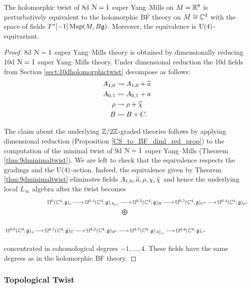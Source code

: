 \documentclass[10pt, oneside]{article}
\begin{document}
\begin{theorem}
The holomorphic twist of 8d $\mathcal N=1$ super Yang--Mills on $M=\mathbb R^8$ is perturbatively equivalent to the holomorphic BF theory on $M\cong\mathbb C^4$ with the space of fields $T^*[-1]\operatorname{Map}(M, B\mathfrak g)$. Moreover, the equivalence is $\mathrm{U}(4)$-equivariant.
\label{thm:8dholomorphictwist}
\end{theorem}
\begin{proof}
8d $\mathcal N=1$ super Yang--Mills theory is obtained by dimensionally reducing 10d $\mathcal N=1$ super Yang--Mills theory. Under dimensional reduction the 10d fields from Section \ref{sect:10dholomorphictwist} decompose as follows:
\begin{align*}
A_{1, 0}&\rightsquigarrow A_{1, 0}+ \widetilde{a} \\
A_{0, 1}&\rightsquigarrow A_{0, 1}+ a \\
\rho&\rightsquigarrow \rho+ \widetilde{\chi} \\
B&\rightsquigarrow B+ C.
\end{align*}

The claim about the underlying $\mathbb Z/2\mathbb Z$-graded theories follows by applying dimensional reduction (Proposition \ref{CS_to_BF_diml_red_prop}) to the computation of the minimal twist of 9d $\mathcal N=1$ super Yang--Mills (Theorem \ref{thm:9dminimaltwist}). We are left to check that the equivalence respects  the gradings and the $\mathrm{U}(4)$-action. Indeed, the equivalence given by Theorem \ref{thm:9dminimaltwist} eliminates fields $A_{1, 0}, \widetilde{a}, \rho, \chi, \widetilde{\chi}$ and hence the underlying local $L_\infty$ algebra after the twist becomes
\[
\xymatrix@R=0.5cm@C=0.5cm{
&\Omega^0(\CC^4; \gg)_c \ar[r] &\Omega^{0,1}(\CC^4; \gg)_{A_{0,1}} \ar[r] &\Omega^{0,2}(\CC^4; \gg)_{B} \ar[r] &\Omega^{0,3}(\CC^4; \gg)_{C^*} \ar[r] &\Omega^{0,4}(\CC^4; \gg)_{a^*} \\
&&\ar@{}^{\bigoplus}[r] &&& \\
\Omega^{4,0}(\CC^4; \gg)_{a} \ar[r] &\Omega^{4,1}(\CC^4; \gg)_C \ar[r] &\Omega^{4,2}(\CC^4; \gg)_{B^*} \ar[r] &\Omega^{4,3}(\CC^4; \gg)_{A_{0,1}^*} \ar[r] &\Omega^{4,4}(\CC^4; \gg)_{c^*}&
}
\]

concentrated in cohomological degrees $-1, \dots, 4$. These fields have the same degrees as in the holomorphic BF theory.
\end{proof}

\subsubsection{Topological Twist}
\label{sect:8dtopologicaltwist}
\end{document}
